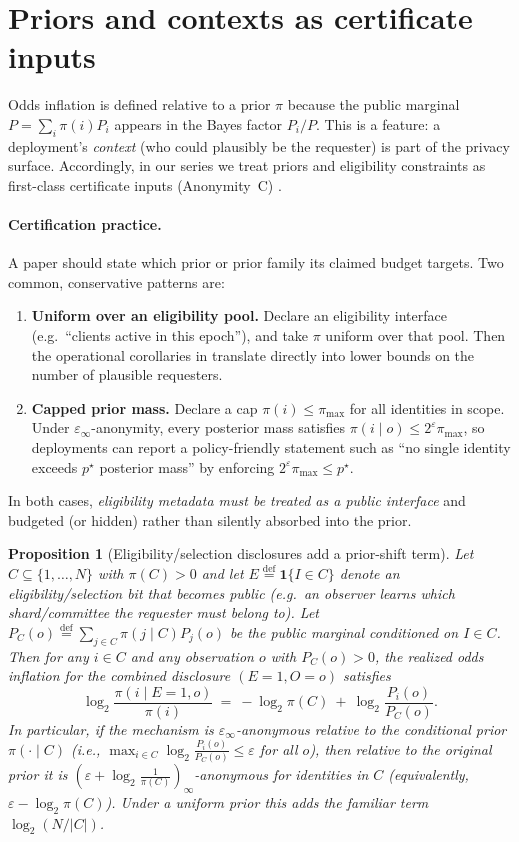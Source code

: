 \documentclass[11pt]{article}
\newcommand{\one}{\mathbf{1}}
\newcommand{\defeq}{\stackrel{\mathrm{def}}{=}}
\newtheorem{proposition}{Proposition}
\theoremstyle{definition}
\theoremstyle{remark}
\begin{document}
\section{Priors and contexts as certificate inputs}\label{sec:priors}
Odds inflation is defined relative to a prior $\pi$ because the public marginal $P=\sum_i \pi(i)P_i$ appears in the Bayes factor $P_i/P$.
This is a feature: a deployment's \emph{context} (who could plausibly be the requester) is part of the privacy surface.
Accordingly, in our series we treat priors and eligibility constraints as first-class certificate inputs (Anonymity~C) \cite{series:abomoinl}.

\paragraph{Certification practice.}
A paper should state which prior or prior family its claimed budget targets.
Two common, conservative patterns are:
\begin{enumerate}[leftmargin=*]
\item \textbf{Uniform over an eligibility pool.} Declare an eligibility interface (e.g.\ ``clients active in this epoch''), and take $\pi$ uniform over that pool.
Then the operational corollaries in  translate directly into lower bounds on the number of plausible requesters.
\item \textbf{Capped prior mass.} Declare a cap $\pi(i)\le \pi_{\max}$ for all identities in scope.
Under $\varepsilon_\infty$-anonymity, every posterior mass satisfies $\pi(i\mid o)\le 2^{\varepsilon}\pi_{\max}$, so deployments can report a policy-friendly statement such as ``no single identity exceeds $p^\star$ posterior mass'' by enforcing $2^{\varepsilon}\pi_{\max}\le p^\star$.
\end{enumerate}
In both cases, \emph{eligibility metadata must be treated as a public interface} and budgeted (or hidden) rather than silently absorbed into the prior.

\begin{proposition}[Eligibility/selection disclosures add a prior-shift term]\label{prop:selection}
Let $C\subseteq\{1,\dots,N\}$ with $\pi(C)>0$ and let $E\defeq\one\{I\in C\}$ denote an eligibility/selection bit that becomes public (e.g.\ an observer learns which shard/committee the requester must belong to).
Let $P_C(o)\defeq\sum_{j\in C}\pi(j\mid C)P_j(o)$ be the public marginal conditioned on $I\in C$.
Then for any $i\in C$ and any observation $o$ with $P_C(o)>0$, the realized odds inflation for the combined disclosure $(E{=}1,O{=}o)$ satisfies
\[
\log_2\frac{\pi(i\mid E{=}1,o)}{\pi(i)}\ =\ -\log_2 \pi(C)\ +\ \log_2\frac{P_i(o)}{P_C(o)}.
\]
In particular, if the mechanism is $\varepsilon_\infty$-anonymous relative to the conditional prior $\pi(\cdot\mid C)$ (i.e., $\max_{i\in C}\log_2\tfrac{P_i(o)}{P_C(o)}\le\varepsilon$ for all $o$), then relative to the original prior it is $(\varepsilon+\log_2\tfrac{1}{\pi(C)})_\infty$-anonymous for identities in $C$ (equivalently, $\varepsilon-\log_2\pi(C)$).
Under a uniform prior this adds the familiar term $\log_2(N/|C|)$.
\end{proposition}
\end{document}
